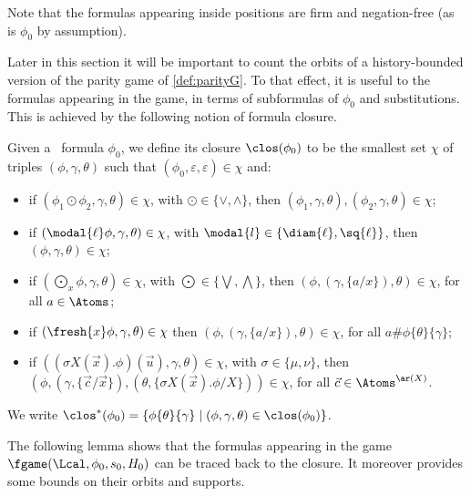 Note that the formulas appearing inside positions are firm and negation-free (as is $\phi_0$ by assumption). 


Later in this section it will be important to count the orbits of a history-bounded version of the parity game of \cref{def:parityG}. To that effect, it is useful to the formulas appearing in the game, in terms of subformulas of $\phi_0$ and substitutions. This is achieved by the following notion of formula closure. 
  
\begin{definition}\label{def:closFresh}
    Given a \fhml\ formula $\phi_0$, we define its closure $\clos(\phi_0)$ to be the smallest set $\chi$ of triples $(\phi,\gamma,\theta)$ such that $(\phi_0,\varepsilon,\varepsilon) \in \chi$ and:
    \begin{itemize}
        \item if $(\phi_1 \odot \phi_2, \gamma,\theta) \in \chi$, with $\odot\in\{\lor,\land\}$, then $(\phi_1, \gamma,\theta), (\phi_2, \gamma,\theta) \in \chi$;
        \item if $(\modal{\ell}\phi, \gamma,\theta) \in \chi$, with $\modal{l}\in\{\diam{\ell},\sq{\ell}\}$, then $(\phi, \gamma,\theta) \in \chi$;
        \item if $(\bigodot_x\phi, \gamma,\theta) \in \chi$, with $\bigodot\in\{\bigvee,\bigwedge\}$,           then $(\phi,(\gamma,\{a/x\}),\theta) \in \chi$, for all $a\in\Atoms$;
        \item if $(\fresh{x}\phi,\gamma, \theta) \in \chi$
          then $(\phi,(\gamma,\{a/x\}), \theta) \in \chi$, for all $a\#\phi\{\theta\}\{\gamma\}$;
        \item if $((\sigma X(\vec x).\phi)(\vec u),\gamma, \theta) \in \chi$, with $\sigma\in\{\mu,\nu\}$, then $(\phi,(\gamma,\{\vec c/\vec x\}), (\theta,\{\sigma X(\vec x).\phi / X\}))\in\chi$, for all $\vec c \in \Atoms^{\ar(X)}$.
            \end{itemize}
    We write $\clos^*(\phi_0) = \{\phi\{\theta\}\{\gamma\}\mid (\phi,\gamma, \theta) \in \clos(\phi_0)\}$.
\end{definition}

The following lemma shows that the formulas appearing in the game $\fgame(\Lcal,\phi_0, s_0,H_0)$ can be traced back to the closure. It moreover provides some bounds on their orbits and supports. 

